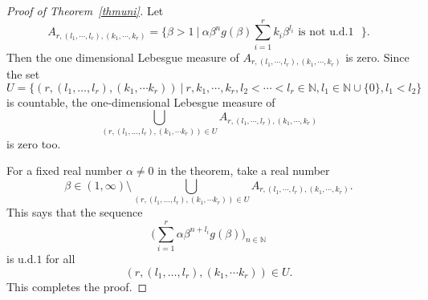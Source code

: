 \documentclass[12pt,letterpaper]{amsart}
\newcommand {\N} {{\mathbb N}}
\begin{document}
\begin{proof}[Proof of Theorem~\ref{thmuni}]
Let 
$$
A_{r, (l_1,\cdots, l_r), (k_{1}, \cdots, k_{r})}=\{ \beta >1 \ | \ \alpha \beta^n g(\beta)
\sum_{i=1}^{r} k_{i} \beta^{l_{i}}  
\text{ is not u.d.$1$ } \}.
$$
Then the one dimensional Lebesgue measure of $A_{r, (l_1,\cdots, l_r), (k_{1}, \cdots, k_{r})}$ is zero. 
Since the set 
$$
U=\{(r, (l_1,\dots,l_r), (k_{1}, \cdots k_{r})) \ |\ r, k_1, \cdots, k_{r}, l_{2}<\cdots <l_{r}\in \N, l_{1}\in \N\cup\{0\} , l_{1}<l_{2}\}
$$ 
is countable, the one-dimensional Lebesgue measure of
$$
\bigcup_{(r, (l_1,\dots,l_r), (k_{1}, \cdots k_{r})) \in U} A_{r, (l_1,\cdots, l_r), (k_{1}, \cdots, k_{r})}
$$
is zero too.

For a fixed real number $\alpha\neq 0$ in the theorem, take a real number 
$$
\beta\in (1,\infty) \setminus \bigcup_{(r, (l_1,\dots,l_r), (k_{1}, \cdots k_{r})) \in U} A_{r, (l_1,\cdots, l_r), (k_{1}, \cdots, k_{r})}.
$$
This says that the sequence 
$$
\Big( \sum_{i=1}^{r} \alpha \beta^{n+l_{i}} g(\beta)\Big)_{n\in \N}
$$ 
is u.d.$1$ for all 
$$
(r, (l_1,\dots,l_r), (k_{1}, \cdots k_{r}))\in U.
$$
This completes the proof.
\end{proof}
 
\end{document}
